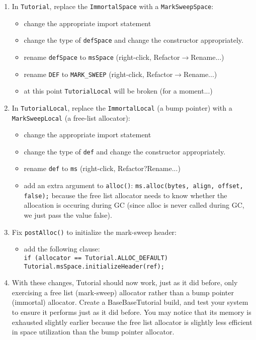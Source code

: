 \documentclass{article}
\newcommand{\code}[1]{\texttt{#1}}
\newcommand{\menu}[0]{$\rightarrow$}
\begin{document}
\begin{itemize}
\begin{enumerate}
\begin{enumerate}
        \item In \code{Tutorial}, replace the \code{ImmortalSpace} with a
        \code{MarkSweepSpace}:
        \begin{itemize}
            \item change the appropriate import statement
            \item change the type of \code{defSpace} and change the constructor
            appropriately.
            \item rename \code{defSpace} to \code{msSpace} (right-click, Refactor\menu{}Rename...)
            \item rename \code{DEF} to \code{MARK\_SWEEP} (right-click, Refactor\menu{}Rename...)
            \item at this point \code{TutorialLocal} will be broken (for a moment...)
        \end{itemize}

        \item In \code{TutorialLocal}, replace the \code{ImmortalLocal} (a bump
        pointer) with a \code{MarkSweepLocal} (a free-list allocator):
        \begin{itemize}
            \item change the appropriate import statement
            \item change the type of \code{def} and change the constructor appropriately.
            \item rename \code{def} to \code{ms} (right-click, Refactor?Rename...)
            \item add an extra argument to \code{alloc()}: \code{ms.alloc(bytes, align, offset,
            false);} because the free list allocator needs to know whether the allocation
            is occuring during GC (since alloc is never called during GC, we just pass the
            value false).
        \end{itemize}

        \item Fix \code{postAlloc()} to initialize the mark-sweep header:
        \begin{itemize}
            \item add the following clause: \\
            \code{if (allocator == Tutorial.ALLOC\_DEFAULT) \\
            Tutorial.msSpace.initializeHeader(ref);}
        \end{itemize}


        \item With these changes, Tutorial should now work, just as it did before,
        only exercising a free list (mark-sweep) allocator rather than a bump pointer
        (immortal) allocator. Create a BaseBaseTutorial build, and test your system to
        ensure it performs just as it did before.  You may notice that its
        memory is exhausted slightly earlier because the free list allocator
        is slightly less efficient in space utilization than the bump
        pointer allocator.
    \end{enumerate}




\end{enumerate}
\end{itemize}
\end{document}
